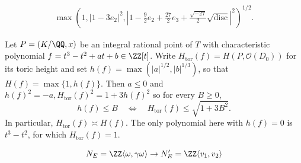 \begin{align}\label{eqn:heightExtraFactor} \max\left( 1, |1-3e_2|^2, \left|1-\tfrac 92 e_2+ \tfrac{27}{2} e_3 + \tfrac{\sqrt{-27}}{2} \sqrt{\mathrm{disc}}\right|^2 \right)^{1/2}. \end{align}

\begin{lemma}\label{lemma:rootVsToric} Let $P=(K/\QQ,x)$ be an integral rational point of $T$ with characteristic polynomial $f=t^3-t^2+at+b\in\ZZ[t]$. Write $H_{\mathrm{tor}}(f)=H(P,\mathcal O(D_0))$ for its toric height and set $h(f)=\max(|a|^{1/2},|b|^{1/3})$, so that $H(f)=\max\{1,h(f)\}$. Then $a\leq0$ and $h(f)^2=-a, H_{\mathrm{tor}}(f)^2=1+3h(f)^2$ so for every $B\geq0$, \begin{equation} h(f)\leq B \quad\Longleftrightarrow\quad H_{\mathrm{tor}}(f)\leq\sqrt{1+3B^2}. \end{equation} In particular, $H_{\mathrm{tor}}(f)\asymp H(f)$. The only polynomial here with $h(f)=0$ is $t^3-t^2$, for which $H_{\mathrm{tor}}(f)=1$. \end{lemma}

\begin{equation}\label{eqn:isoCocharLattices} N_E=\ZZ\langle\omega,\gamma\omega \rangle \to N_E'=\ZZ\langle v_1,v_2\rangle \end{equation}

